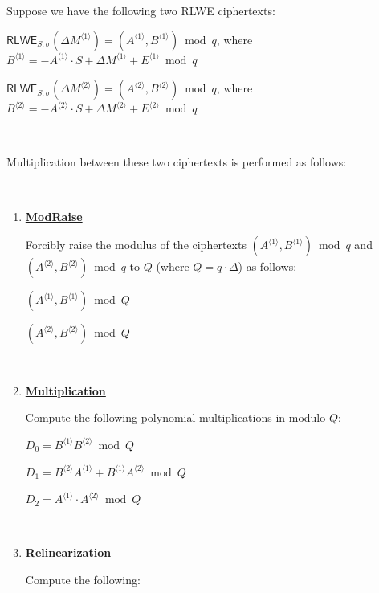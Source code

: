 \begin{tcolorbox}[title={\textbf{\tboxlabel{\ref*{subsubsec:bfv-mult-cipher-summary}} BFV's Ciphertext-to-Ciphertext Multiplication}}]


Suppose we have the following two RLWE ciphertexts:

$\textsf{RLWE}_{S, \sigma}(\Delta M^{\langle 1 \rangle}) = (A^{\langle 1 \rangle}, B^{\langle 1 \rangle}) \bmod q$, \text{ } where $B^{\langle 1 \rangle} = -A^{\langle 1 \rangle} \cdot S + \Delta M^{\langle 1 \rangle} + E^{\langle 1 \rangle} \bmod q$

$\textsf{RLWE}_{S, \sigma}(\Delta M^{\langle 2 \rangle}) = (A^{\langle 2 \rangle}, B^{\langle 2 \rangle})  \bmod q$, \text{ } where $B^{\langle 2 \rangle} = -A^{\langle 2 \rangle} \cdot S + \Delta M^{\langle 2 \rangle} + E^{\langle 2 \rangle} \bmod q$

$ $

Multiplication between these two ciphertexts is performed as follows:

$ $

\begin{enumerate}

\item \textbf{\underline{\textsf{ModRaise}}}

Forcibly raise the modulus of the ciphertexts $(A^{\langle 1 \rangle}, B^{\langle 1 \rangle}) \bmod q$ and $(A^{\langle 2 \rangle}, B^{\langle 2 \rangle}) \bmod q$ to $Q$ (where $Q = q \cdot \Delta$) as follows:

$(A^{\langle 1 \rangle}, B^{\langle 1 \rangle}) \bmod Q$

$(A^{\langle 2 \rangle}, B^{\langle 2 \rangle}) \bmod Q$


$ $

\item \textbf{\underline{Multiplication}}

Compute the following polynomial multiplications in modulo $Q$: 

$D_0 = B^{\langle 1 \rangle}B^{\langle 2 \rangle} \bmod Q$

$D_1 = B^{\langle 2 \rangle}A^{\langle 1 \rangle} +  B^{\langle 1 \rangle}A^{\langle 2 \rangle} \bmod Q$

$D_2 = A^{\langle 1 \rangle} \cdot A^{\langle 2 \rangle} \bmod Q$


$ $

\item \textbf{\underline{Relinearization}} 


Compute the following:


\end{enumerate}
\end{tcolorbox}
